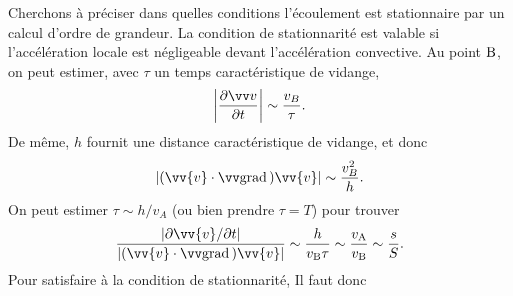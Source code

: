 \documentclass[12pt,fancy]{cours}
\begin{document}
 Cherchons à préciser dans quelles conditions
l'écoulement est stationnaire par un calcul d’ordre de grandeur. La condition de stationnarité est valable si l’accélération locale est négligeable devant l’accélération convective. Au point $\rm B$, on peut estimer, avec $\tau$ un temps caractéristique de vidange,
\begin{equation}
\norm{\dr{\Vec{v}}{t}} \sim \dfrac{v_B}{\tau}.
\end{equation}
De même, $h$ fournit une distance caractéristique de vidange, et donc
\begin{equation}
\norm{ (\vv{v}\cdot\grad{})\vv{v} } \sim \dfrac{v_B^2}{h}.
\end{equation}
On peut estimer $\tau \sim h/v_A$ (ou bien prendre $\tau = T$) pour trouver
\begin{equation}
\frac{\norm{\partial\vv{v}/\partial t}}{\norm{(\vv{v}\cdot\grad{})\vv{v}}}\sim\frac{h}{v_{\rm{B}}\tau}\sim\frac{v_{\rm{A}}}{v_{\rm{B}}}\sim\frac{s}{S}.
\end{equation}
Pour satisfaire à la condition de stationnarité, Il faut donc 
\end{document}

